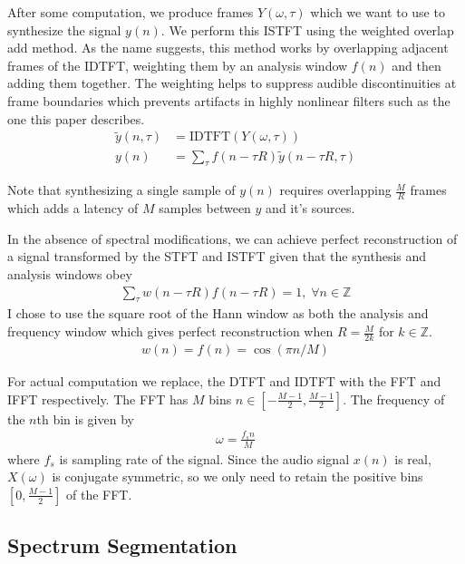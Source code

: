 \documentclass[12pt]{article}
\begin{document}
After some computation, 
we produce frames $Y(\omega, \tau)$ 
which we want to use to synthesize the signal $y(n)$.
We perform this ISTFT using the weighted overlap add method.
As the name suggests, this method works by
overlapping adjacent frames of the IDTFT, 
weighting them by an analysis window $f(n)$ 
and then adding them together.
The weighting helps to suppress audible discontinuities at frame boundaries
which prevents artifacts in highly nonlinear filters such as the one this paper describes.
\begin{align}
  \tilde{y}(n,\tau) &= \text{IDTFT}(Y(\omega, \tau))
  \\
  y(n) &= \sum_\tau f(n - \tau R)\tilde{y}(n - \tau R,\tau)
\end{align}

Note that synthesizing a single sample of $y(n)$ requires overlapping
$\frac{M}{R}$ frames which adds a latency of $M$ samples between $y$ and it's sources.

In the absence of spectral modifications, 
we can achieve perfect reconstruction 
of a signal transformed by the STFT and ISTFT given
that the synthesis and analysis windows obey
\begin{align}
  \sum_\tau w(n - \tau R)f(n - \tau R) = 1,\; \forall n\in \mathbb{Z}
\end{align}
I chose to use the square root of the Hann window as both the analysis and frequency window
which gives perfect reconstruction when $R = \frac{M}{2k}$ for $k\in\mathbb{Z}$.
\begin{align}
  w(n) = 
  f(n) =
  \cos(\pi n / M)
\end{align}

For actual computation we replace, the DTFT and IDTFT with the FFT and IFFT respectively. 
The FFT has $M$ bins $n\in\left[-\frac{M - 1}{2}, \frac{M - 1}{2}\right]$.
The frequency of the $n$th bin is given by
\begin{align}
  \omega = \frac{f_s n}{M}
\end{align}
where $f_s$ is sampling rate of the signal.
Since the audio signal $x(n)$ is real, $X(\omega)$ is conjugate symmetric, so we only need to retain the positive bins $\left[0, \frac{M - 1}{2}\right]$ of the FFT.


\subsection{Spectrum Segmentation}
\end{document}
